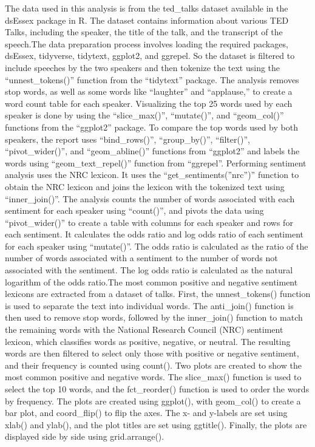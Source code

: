\documentclass[
]{article}
\begin{document}
The data used in this analysis is from the ted\_talks dataset available
in the dsEssex package in R. The dataset contains information about
various TED Talks, including the speaker, the title of the talk, and the
transcript of the speech.The data preparation process involves loading
the required packages, dsEssex, tidyverse, tidytext, ggplot2, and
ggrepel. So the dataset is filtered to include speeches by the two
speakers and then tokenize the text using the ``unnest\_tokens()''
function from the ``tidytext'' package. The analysis removes stop words,
as well as some words like ``laughter'' and ``applause,'' to create a
word count table for each speaker. Visualizing the top 25 words used by
each speaker is done by using the ``slice\_max()'', ``mutate()'', and
``geom\_col()'' functions from the ``ggplot2'' package. To compare the
top words used by both speakers, the report uses ``bind\_rows()'',
``group\_by()'', ``filter()'', ``pivot\_wider()'', and
``geom\_abline()'' functions from ``ggplot2'' and labels the words using
``geom\_text\_repel()'' function from ``ggrepel''. Performing sentiment
analysis uses the NRC lexicon. It uses the ``get\_sentiments(''nrc'')''
function to obtain the NRC lexicon and joins the lexicon with the
tokenized text using ``inner\_join()''. The analysis counts the number
of words associated with each sentiment for each speaker using
``count()'', and pivots the data using ``pivot\_wider()'' to create a
table with columns for each speaker and rows for each sentiment. It
calculates the odds ratio and log odds ratio of each sentiment for each
speaker using ``mutate()''. The odds ratio is calculated as the ratio of
the number of words associated with a sentiment to the number of words
not associated with the sentiment. The log odds ratio is calculated as
the natural logarithm of the odds ratio.The most common positive and
negative sentiment lexicons are extracted from a dataset of talks.
First, the unnest\_tokens() function is used to separate the text into
individual words. The anti\_join() function is then used to remove stop
words, followed by the inner\_join() function to match the remaining
words with the National Research Council (NRC) sentiment lexicon, which
classifies words as positive, negative, or neutral. The resulting words
are then filtered to select only those with positive or negative
sentiment, and their frequency is counted using count(). Two plots are
created to show the most common positive and negative words. The
slice\_max() function is used to select the top 10 words, and the
fct\_reorder() function is used to order the words by frequency. The
plots are created using ggplot(), with geom\_col() to create a bar plot,
and coord\_flip() to flip the axes. The x- and y-labels are set using
xlab() and ylab(), and the plot titles are set using ggtitle(). Finally,
the plots are displayed side by side using grid.arrange().
\end{document}
